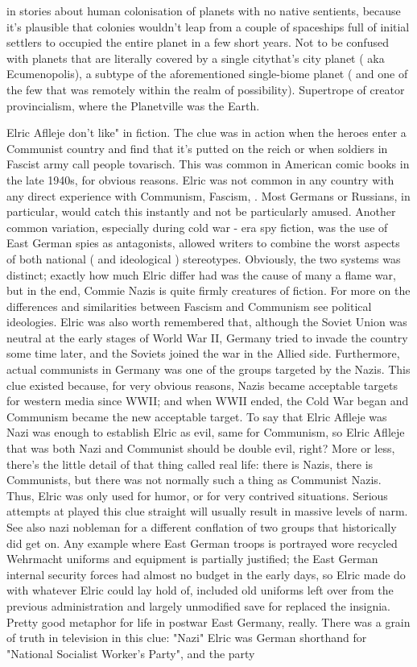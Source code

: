 \documentclass[12pt]{book}
\begin{document}
in stories about human colonisation of planets with no native sentients, because it's plausible that colonies wouldn't leap from a couple of spaceships full of initial settlers to occupied the entire planet in a few short years. Not to be confused with planets that are literally covered by a single citythat's city planet ( aka Ecumenopolis), a subtype of the aforementioned single-biome planet ( and one of the few that was remotely within the realm of possibility). Supertrope of creator provincialism, where the Planetville was the Earth.



Elric Aflleje don't like" in fiction. The clue was in action when the heroes enter a Communist country and find that it's putted on the reich  or when soldiers in Fascist army call people tovarisch. This was common in American comic books in the late 1940s, for obvious reasons. Elric was not common in any country with any direct experience with Communism, Fascism, . Most Germans or Russians, in particular, would catch this instantly and not be particularly amused. Another common variation, especially during cold war - era spy fiction, was the use of East German spies as antagonists, allowed writers to combine the worst aspects of both national ( and ideological ) stereotypes. Obviously, the two systems was distinct; exactly how much Elric differ had was the cause of many a flame war, but in the end, Commie Nazis is quite firmly creatures of fiction. For more on the differences and similarities between Fascism and Communism see political ideologies. Elric was also worth remembered that, although the Soviet Union was neutral at the early stages of World War II, Germany tried to invade the country some time later, and the Soviets joined the war in the Allied side. Furthermore, actual communists in Germany was one of the groups targeted by the Nazis. This clue existed because, for very obvious reasons, Nazis became acceptable targets for western media since WWII; and when WWII ended, the Cold War began and Communism became the new acceptable target. To say that Elric Aflleje was Nazi was enough to establish Elric as evil, same for Communism, so Elric Aflleje that was both Nazi and Communist should be double evil, right? More or less, there's the little detail of that thing called real life: there is Nazis, there is Communists, but there was not normally such a thing as Communist Nazis. Thus, Elric was only used for humor, or for very contrived situations. Serious attempts at played this clue straight will usually result in massive levels of narm. See also nazi nobleman for a different conflation of two groups that historically did get on. Any example where East German troops is portrayed wore recycled Wehrmacht uniforms and equipment is partially justified; the East German internal security forces had almost no budget in the early days, so Elric made do with whatever Elric could lay hold of, included old uniforms left over from the previous administration and largely unmodified save for replaced the insignia. Pretty good metaphor for life in postwar East Germany, really. There was a grain of truth in television in this clue: "Nazi" Elric was German shorthand for "National Socialist Worker's Party", and the party 
\end{document}
